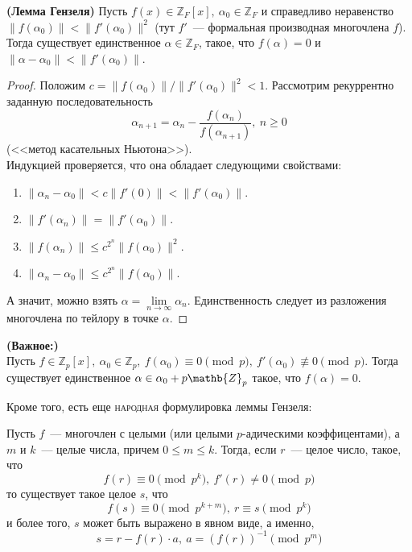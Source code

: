 \documentclass[11pt]{article}
\begin{document}
    \begin{theorem} \textbf{(Лемма Гензеля)}
        Пусть $f(x) \in \mathbb{Z}_{F}[x], \ \alpha_0 \in \mathbb{Z}_{F}$ и справедливо неравенство $\| f(\alpha_0) \| < \| f'(\alpha_0)\|^2$ (тут $f'$~--- формальная производная многочлена $f$).
        Тогда существует единственное $\alpha \in \mathbb{Z}_{F}$, такое, что $f(\alpha) = 0$ и $\| \alpha - \alpha_0\| < \| f'(\alpha_0) \|$.
    \end{theorem}
    \begin{proof}
        Положим $c = \| f(\alpha_0) \| / \| f'(\alpha_0)\|^2 < 1$. Рассмотрим рекуррентно заданную последовательность
        \[ \alpha_{n + 1} = \alpha_n - \frac{f(\alpha_n)}{f(\alpha_{n + 1})}, \ n \ge 0 \]
        (<<метод касательных Ньютона>>). \\
        Индукцией проверяется, что она обладает следующими свойствами:
        \begin{enumerate}
            \item $\| \alpha_n - \alpha_0 \| < c \| f'(0) \| < \| f'(\alpha_0) \|$.
            \item $\| f'(\alpha_n)\| = \| f'(\alpha_0)\|$.
            \item $\| f(\alpha_n) \| \le c^{2^n} \| f(\alpha_0) \|^2$.
            \item $\| \alpha_n - \alpha_0 \| \le c^{2^n} \| f(\alpha_0) \|$.
        \end{enumerate}

        А значит, можно взять $\alpha = \lim\limits_{n \to \infty} \alpha_n$.
        Единственность следует из разложения многочлена по тейлору в точке $\alpha$.
    \end{proof}
    \begin{corollary} \textbf{(Важное:)} \\
         Пусть $f \in \mathbb{Z}_p[x], \ \alpha_0 \in \mathbb{Z}_p,\ f(\alpha_0) \equiv 0 \pmod{p}, \ f'(\alpha_0) \not\equiv 0 \pmod{p}$.
        Тогда существует единственное $\alpha \in \alpha_0 + p\mathb{Z}_p$ такое, что $f(\alpha) = 0$.
     \end{corollary}

    Кроме того, есть еще \textsc{народная} формулировка леммы Гензеля:
    \begin{theorem}
        Пусть $f$~--- многочлен с целыми (или целыми $p$-адическими коэффицентами), а $m$ и  $k$~--- целые числа, причем
        $0 \le m \le k$. Тогда, если $r$~--- целое число, такое, что
        \[ f(r) \equiv 0 \pmod{p^k}, \ f'(r) \neq 0 \pmod{p} \]
        то существует такое целое $s$, что
        \[ f(s) \equiv 0 \pmod{p^{k + m}}, \  r \equiv s \pmod{p^k} \]
        и более того, $s$ может быть выражено в явном виде, а именно,
        \[ s = r - f(r) \cdot a, \ a = (f(r))^{-1} \pmod{p^m}\]

    \end{theorem}
\end{document}
